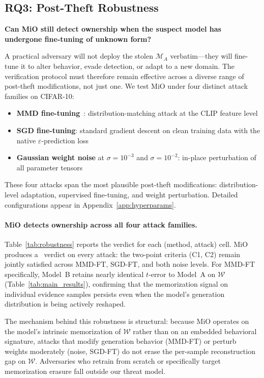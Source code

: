 \documentclass{article}
\newcommand{\cmark}{\ding{51}}
\begin{document}
\subsection{RQ3: Post-Theft Robustness}
\label{sec:theft}

\textbf{Can MiO still detect ownership when the suspect model has 
undergone fine-tuning of unknown form?}

A practical adversary will not deploy the stolen $\mathcal{M}_A$ 
verbatim—they will fine-tune it to alter behavior, evade detection, 
or adapt to a new domain. The verification protocol must therefore 
remain effective across a diverse range of post-theft modifications, 
not just one. We test MiO under four distinct attack families on 
CIFAR-10:

\begin{itemize}
    \item \textbf{MMD fine-tuning}~\citep{gretton2012kernel}: 
    distribution-matching attack at the CLIP feature level
    \item \textbf{SGD fine-tuning}: standard gradient descent on 
    clean training data with the native $\varepsilon$-prediction loss
    \item \textbf{Gaussian weight noise} at $\sigma = 10^{-3}$ and 
    $\sigma = 10^{-2}$: in-place perturbation of all parameter tensors
\end{itemize}

These four attacks span the most plausible post-theft modifications: 
distribution-level adaptation, supervised fine-tuning, and weight 
perturbation. Detailed configurations appear in Appendix~\ref{app:hyperparams}.

\paragraph{MiO detects ownership across all four attack families.}
Table~\ref{tab:robustness} reports the verdict for each (method, 
attack) cell. MiO produces a \cmark\ verdict on every attack: the 
two-point criteria (C1, C2) remain jointly satisfied across MMD-FT, 
SGD-FT, and both noise levels. For MMD-FT specifically, Model~B 
retains nearly identical $t$-error to Model~A on $\mathcal{W}$ 
(Table~\ref{tab:main_results}), confirming that the memorization 
signal on individual evidence samples persists even when the model's 
generation distribution is being actively reshaped.

The mechanism behind this robustness is structural: because MiO 
operates on the model's intrinsic memorization of $\mathcal{W}$ 
rather than on an embedded behavioral signature, attacks that modify 
generation behavior (MMD-FT) or perturb weights moderately 
(noise, SGD-FT) do not erase the per-sample reconstruction gap on 
$\mathcal{W}$. Adversaries who retrain from scratch or specifically 
target memorization erasure fall outside our threat model.
\end{document}
